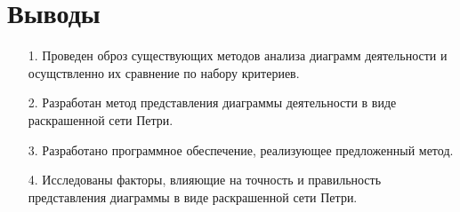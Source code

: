 \documentclass[12pt]{article}
\begin{document}
\begin{minipage}[H]{0.49\linewidth}
\end{minipage}
\hfill
\begin{minipage}[H]{0.49\linewidth}
\end{minipage}



\section{Выводы}

\begin{enumerate}
\item[1.] Проведен оброз существующих методов анализа диаграмм деятельности и осущствленно их сравнение по набору критериев.
\item[2.] Разработан метод представления диаграммы деятельности в виде раскрашенной сети Петри.
\item[3.] Разработано программное обеспечение, реализующее предложенный метод.
\item[4.] Исследованы факторы, влияющие на точность и правильность представления диаграммы в виде раскрашенной сети Петри.
\end{enumerate}
\end{document}
